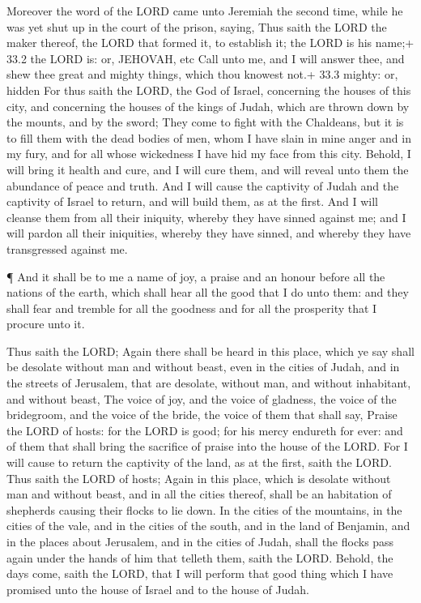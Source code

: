  Moreover the word of the LORD came unto Jeremiah the second
time, while he was yet shut up in the court of the prison, saying,
 Thus saith the LORD the maker thereof, the LORD that formed
it, to establish it; the LORD is his name;+ 33.2 the LORD is: or,
JEHOVAH, etc  Call unto me, and I will answer thee, and shew
thee great and mighty things, which thou knowest not.+ 33.3 mighty: or,
hidden  For thus saith the LORD, the God of Israel,
concerning the houses of this city, and concerning the houses of the
kings of Judah, which are thrown down by the mounts, and by the sword;
 They come to fight with the Chaldeans, but it is to fill
them with the dead bodies of men, whom I have slain in mine anger and in
my fury, and for all whose wickedness I have hid my face from this city.
 Behold, I will bring it health and cure, and I will cure
them, and will reveal unto them the abundance of peace and truth.
 And I will cause the captivity of Judah and the captivity
of Israel to return, and will build them, as at the first. 
And I will cleanse them from all their iniquity, whereby they have
sinned against me; and I will pardon all their iniquities, whereby they
have sinned, and whereby they have transgressed against me.

 ¶ And it shall be to me a name of joy, a praise and an
honour before all the nations of the earth, which shall hear all the
good that I do unto them: and they shall fear and tremble for all the
goodness and for all the prosperity that I procure unto it.

 Thus saith the LORD; Again there shall be heard in this
place, which ye say shall be desolate without man and without beast,
even in the cities of Judah, and in the streets of Jerusalem, that are
desolate, without man, and without inhabitant, and without beast,
 The voice of joy, and the voice of gladness, the voice of
the bridegroom, and the voice of the bride, the voice of them that shall
say, Praise the LORD of hosts: for the LORD is good; for his mercy
endureth for ever: and of them that shall bring the sacrifice of praise
into the house of the LORD. For I will cause to return the captivity of
the land, as at the first, saith the LORD.  Thus saith the
LORD of hosts; Again in this place, which is desolate without man and
without beast, and in all the cities thereof, shall be an habitation of
shepherds causing their flocks to lie down.  In the cities
of the mountains, in the cities of the vale, and in the cities of the
south, and in the land of Benjamin, and in the places about Jerusalem,
and in the cities of Judah, shall the flocks pass again under the hands
of him that telleth them, saith the LORD.  Behold, the days
come, saith the LORD, that I will perform that good thing which I have
promised unto the house of Israel and to the house of Judah.

